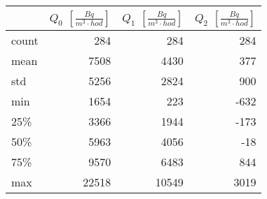 \begin{tabular}{lrrr}
\toprule
{} &  $Q_0$ $\left[\si{\frac{Bq}{m^3\cdot hod}}\right]$ &  $Q_1$ $\left[\si{\frac{Bq}{m^3\cdot hod}}\right]$ &  $Q_2$ $\left[\si{\frac{Bq}{m^3\cdot hod}}\right]$ \\
\midrule
count &  284 &                                                284 &                                                284 \\
mean  & 7508 &                                               4430 &                                                377 \\
std   & 5256 &                                               2824 &                                                900 \\
min   & 1654 &                                                223 &                                               -632 \\
25\%   & 3366 &                                               1944 &                                               -173 \\
50\%   & 5963 &                                               4056 &                                                -18 \\
75\%   & 9570 &                                               6483 &                                                844 \\
max   &22518 &                                              10549 &                                               3019 \\
\bottomrule
\end{tabular}
